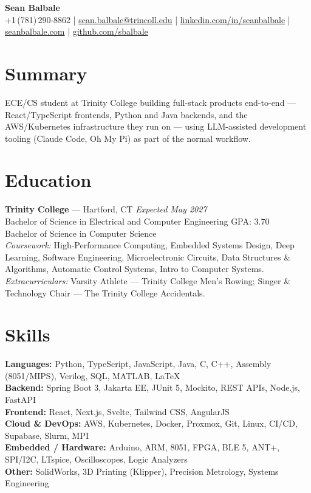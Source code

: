\documentclass[10pt, letterpaper]{article}
\begin{document}
\small

\begin{center}
  {\Large \textbf{Sean Balbale}}\\[1pt]
  \small
  +1\,(781)\,290-8862 \;|\;
  \href{mailto:sean.balbale@trincoll.edu}{sean.balbale@trincoll.edu} \;|\;
  \href{https://www.linkedin.com/in/seanbalbale/}{linkedin.com/in/seanbalbale} \;|\;
  \href{https://seanbalbale.com}{seanbalbale.com} \;|\;
  \href{https://github.com/sbalbale}{github.com/sbalbale}
\end{center}

\section{Summary}

\noindent
ECE/CS student at Trinity College building full-stack products end-to-end --- React/TypeScript
frontends, Python and Java backends, and the AWS/Kubernetes infrastructure they run on ---
using LLM-assisted development tooling (Claude Code, Oh My Pi) as part of the normal workflow.

\section{Education}

\noindent
\textbf{Trinity College} --- Hartford, CT \hfill \textit{Expected May 2027}\\
Bachelor of Science in Electrical and Computer Engineering \hfill GPA: 3.70\\
Bachelor of Science in Computer Science\\
\textit{Coursework:} High-Performance Computing, Embedded Systems Design, Deep Learning,
Software Engineering, Microelectronic Circuits, Data Structures \& Algorithms,
Automatic Control Systems, Intro to Computer Systems.\\
\textit{Extracurriculars:} Varsity Athlete --- Trinity College Men's Rowing;\quad
Singer \& Technology Chair --- The Trinity College Accidentals.

\section{Skills}

\noindent
\textbf{Languages:} Python, TypeScript, JavaScript, Java, C, C++,
Assembly (8051/MIPS), Verilog, SQL, MATLAB, LaTeX\\
\textbf{Backend:} Spring Boot 3, Jakarta EE, JUnit 5, Mockito, REST APIs, Node.js, FastAPI\\
\textbf{Frontend:} React, Next.js, Svelte, Tailwind CSS, AngularJS\\
\textbf{Cloud \& DevOps:} AWS, Kubernetes, Docker, Proxmox, Git, Linux, CI/CD, Supabase, Slurm, MPI\\
\textbf{Embedded / Hardware:} Arduino, ARM, 8051, FPGA, BLE 5, ANT+, SPI/I2C, LTspice, Oscilloscopes, Logic Analyzers\\
\textbf{Other:} SolidWorks, 3D Printing (Klipper), Precision Metrology, Systems Engineering
\end{document}
